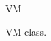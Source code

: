 \begin{figure}[H]
\centering
\begin{class}{VM}
\end{class}
\caption{VM class.}
\label{oz_vm_class}
\end{figure}